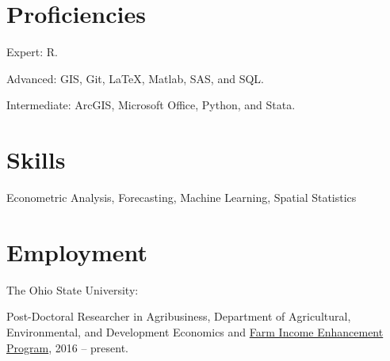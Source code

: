 \documentclass[letterpaper]{article}
\renewenvironment{itemize}{
  \begin{list}{}{
    \setlength{\leftmargin}{1.5em}
  }
}{
  \end{list}
}
\begin{document}
\section*{Proficiencies}
\begin{itemize}
\item Expert: R.
\item Advanced: GIS, Git, \LaTeX, Matlab, SAS, and SQL.
\item Intermediate: ArcGIS, Microsoft Office, Python, and Stata.
\end{itemize}

\section*{Skills}
\begin{itemize}
\item Econometric Analysis, Forecasting, Machine Learning, Spatial Statistics
\end{itemize}


\section*{Employment}
\begin{itemize}
\item The Ohio State University:
\begin{itemize}
\item Post-Doctoral Researcher in Agribusiness, Department of Agricultural, Environmental, and Development Economics and \href{http://aede.osu.edu/programs/farm-income-enhancement-program}{Farm Income Enhancement Program}, 2016 -- present.
\end{itemize}
\end{itemize}
\end{document}
